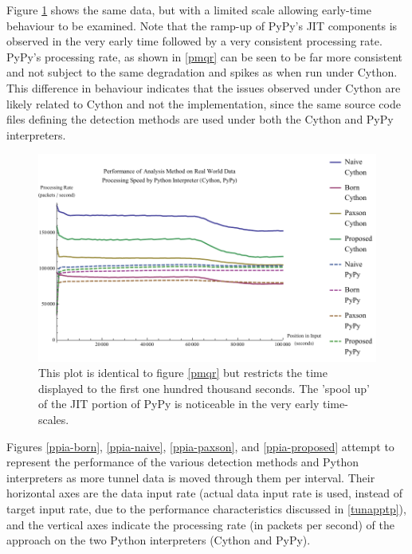 \documentclass[12pt]{report}
\theoremstyle{remark}
\theoremstyle{definition}
\theoremstyle{definition}
\theoremstyle{definition}
\begin{document}
Figure \ref{pmqr-100k} shows the same data, but with a limited scale allowing
early-time behaviour to be examined. Note that the ramp-up of PyPy's JIT
components is observed in the very early time followed by a very consistent
processing rate. PyPy's processing rate, as shown in \ref{pmqr} can be seen to be
far more consistent and not subject to the same degradation and spikes as when
run under Cython. This difference in behaviour indicates that the issues
observed under Cython are likely related to Cython and not the implementation,
since the same source code files defining the detection methods are used
under both the Cython and PyPy interpreters.

\begin{figure}
\centering
\includegraphics[width=\textwidth]{figures/pmqr-100k.pdf}
\caption[Performance of Analysis Method and Python Interpreter on Real World
Data - Early Time]{This plot is identical to figure \ref{pmqr} but restricts the time
displayed to the first one hundred thousand seconds. The 'spool up' of the JIT
portion of PyPy is noticeable in the very early time-scales.}
\label{pmqr-100k}
\end{figure}

Figures \ref{ppia-born}, \ref{ppia-naive}, \ref{ppia-paxson}, and
\ref{ppia-proposed} attempt to represent the performance of the various
detection methods and Python interpreters as more tunnel data is moved through
them per interval. Their horizontal axes are the data input rate (actual data
input rate is used, instead of target input rate, due to the performance
characteristics discussed in \ref{tunapptp}), and the vertical axes indicate the
processing rate (in packets per second) of the approach on the two Python
interpreters (Cython and PyPy).
\end{document}
